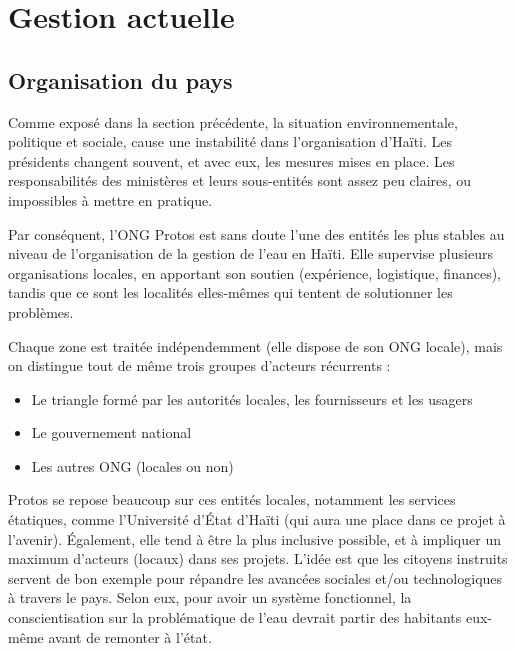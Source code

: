 \documentclass{EPL-master-thesis-covers-FR}
\begin{document}
		\section{Gestion actuelle}

			\subsection*{Organisation du pays}

    			Comme exposé dans la section précédente, la situation environnementale, politique et sociale, cause une instabilité dans l'organisation d'Haïti. Les présidents changent souvent, et avec eux, les mesures mises en place. Les responsabilités des ministères et leurs sous-entités sont assez peu claires, ou impossibles à mettre en pratique.

    			Par conséquent, l'ONG Protos est sans doute l'une des entités les plus stables au niveau de l'organisation de la gestion de l'eau en Haïti. Elle supervise plusieurs organisations locales, en apportant son soutien (expérience, logistique, finances), tandis que ce sont les localités elles-mêmes qui tentent de solutionner les problèmes.

    			Chaque zone est traitée indépendemment (elle dispose de son ONG locale), mais on distingue tout de même trois groupes d'acteurs récurrents :
    			\begin{itemize}
    				\item Le triangle formé par les autorités locales, les fournisseurs et les usagers
    				\item Le gouvernement national
    				\item Les autres ONG (locales ou non)
    			\end{itemize}

    			Protos se repose beaucoup sur ces entités locales, notamment les services étatiques, comme l'Université d'\'Etat d'Haïti (qui aura une place dans ce projet à l'avenir). \'Egalement, elle tend à être la plus inclusive possible, et à impliquer un maximum d'acteurs (locaux) dans ses projets. L'idée est que les citoyens instruits servent de bon exemple pour répandre les avancées sociales et/ou technologiques à travers le pays. Selon eux, pour avoir un système fonctionnel, la conscientisation sur la problématique de l'eau devrait partir des habitants eux-même avant de remonter à l'état.

\end{document}
